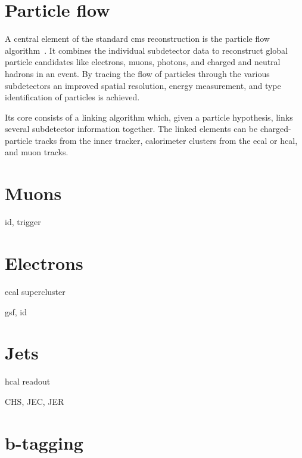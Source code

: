 \section{Particle flow}

A central element of the standard \gls{cms} reconstruction is the particle flow algorithm~\cite{CMS:2009nxa}. It combines the individual subdetector data to reconstruct global particle candidates like electrons, muons, photons, and charged and neutral hadrons in an event. By tracing the flow of particles through the various subdetectors an improved spatial resolution, energy measurement, and type identification of particles is achieved.

Its core consists of a linking algorithm which, given a particle hypothesis, links several subdetector information together. The linked elements can be charged-particle tracks from the inner tracker, calorimeter clusters from the \gls{ecal} or \gls{hcal}, and muon tracks. 


\section{Muons}



id, trigger

\section{Electrons}
\label{sec:reconstruction-electrons}

ecal supercluster

gsf, id

\section{Jets}

hcal readout

CHS, JEC, JER

\section{b-tagging}

